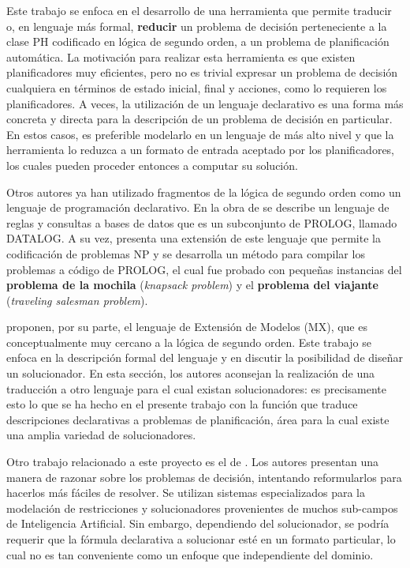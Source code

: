 Este trabajo se enfoca en el desarrollo de una herramienta que permite
traducir o, en lenguaje más formal, \textbf{reducir} un problema de
decisión perteneciente a la clase PH codificado en lógica de segundo orden,
a un problema de planificación automática. 
La motivación para realizar esta herramienta es que
existen planificadores muy eficientes, pero no es trivial
expresar un problema de decisión cualquiera en términos de estado inicial,
final y acciones, como lo requieren los
planificadores. A veces, la utilización de un lenguaje declarativo es una forma
más concreta y directa para la descripción de un problema de decisión en
particular. En estos casos, es preferible modelarlo en un lenguaje de más alto
nivel y que la herramienta lo reduzca a un formato de entrada aceptado por
los planificadores, los cuales pueden proceder entonces a computar su solución.

Otros autores ya han utilizado fragmentos de la lógica de segundo orden como un lenguaje de
programación declarativo. En la obra de \cite{reiter:cwa} se describe un
lenguaje de reglas y consultas a bases de datos que es un subconjunto de
PROLOG, llamado DATALOG. A su vez, \cite{cadoli:npspec} presenta una
extensión de este lenguaje que permite la codificación de problemas NP y
se desarrolla un método para compilar los problemas a código de PROLOG, el cual
fue probado con pequeñas instancias del \textbf{problema de la mochila}
(\textit{knapsack problem}) y el \textbf{problema del viajante}
(\textit{traveling salesman problem}).

\cite{mitchell:npsearch} proponen, por su parte, el lenguaje de
Extensión de Modelos (MX), que es conceptualmente muy cercano a la lógica de
segundo orden. Este trabajo se enfoca en la descripción formal del lenguaje y
en discutir la posibilidad de diseñar un solucionador. En esta sección, los
autores aconsejan la realización de una traducción a otro lenguaje para el cual
existan solucionadores: es precisamente esto lo que se ha hecho en el presente
trabajo con la función que traduce descripciones declarativas a problemas
de planificación, área para la cual existe una amplia variedad de solucionadores.

Otro trabajo relacionado a este proyecto es el de \cite{cadoli:safedelay}. Los
autores presentan una manera de razonar sobre los problemas de
decisión, intentando reformularlos para hacerlos más fáciles de resolver. Se
utilizan sistemas especializados para la modelación de restricciones y
solucionadores provenientes de muchos sub-campos de Inteligencia Artificial.
Sin embargo, dependiendo del solucionador, se podría requerir que la fórmula
declarativa a solucionar esté en un formato particular, lo cual no es tan
conveniente como un enfoque que independiente del dominio.

